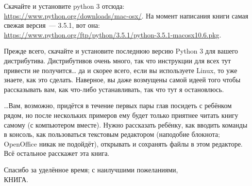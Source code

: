 \begin{MAC}
	
Скачайте и установите python 3 отсюда: \url{https://www.python.org/downloads/mac-osx/}. На момент написания книги самая свежая версия — 3.5.1, вот она: \url{https://www.python.org/ftp/python/3.5.1/python-3.5.1-macosx10.6.pkg}.


\end{MAC}

\begin{LINUX}

Прежде всего, скачайте и установите последнюю версию Python 3 для вашего дистрибутива. Дистрибутивов очень много, так что инструкции для всех тут привести не получится… да и скорее всего, если вы используете Linux, то уже знаете, как это сделать. Наверное, вы даже возмущены самой идеей того чтобы рассказывать вам, как что-либо устанавливать, так что тут я остановлюсь.

\end{LINUX}


…Вам, возможно, придётся в течение первых пары глав посидеть с ребёнком рядом, но после нескольких примеров ему будет только приятнее читать книгу самому (с компьютером вместе). Нужно рассказать ребёнку, как вводить команды в консоль, как пользоваться текстовым редактором (наподобие блокнота; OpenOffice никак не подойдёт), открывать и сохранять файлы в этом редакторе. Всё остальное расскажет эта книга.

\vspace{12pt}
\noindent
Спасибо за уделённое время; с наилучшими пожеланиями,\\
КНИГА.

